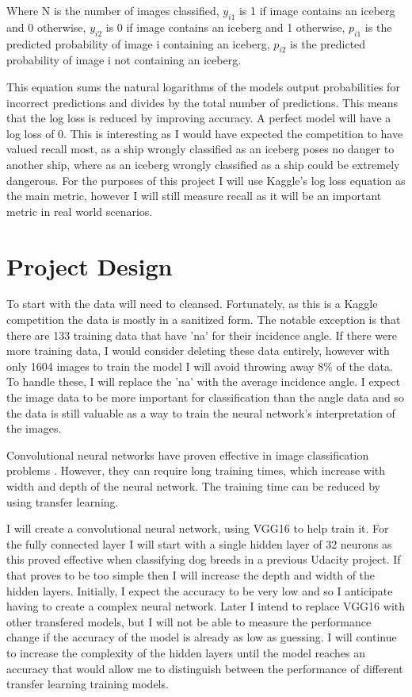 \documentclass{article}
\begin{document}
Where N is the number of images classified, $y_{i1}$ is 1 if image contains an iceberg and 0 otherwise, $y_{i2}$ is 0 if image contains an iceberg and 1 otherwise, $p_{i1}$ is the predicted probability of image i containing an iceberg, $p_{i2}$ is the predicted probability  of image i not containing an iceberg. 

This equation sums the natural logarithms of the models output probabilities for incorrect predictions and divides by the total number of predictions. This means that the log loss is reduced by improving accuracy. A perfect model will have a log loss of 0. This is interesting as I would have expected the competition to have valued recall most, as a ship wrongly classified as an iceberg poses no danger to another ship, where as an iceberg wrongly classified as a ship could be extremely dangerous. For the purposes of this project I will use Kaggle's log loss equation as the main metric, however I will still measure recall as it will be an important metric in real world scenarios. 

\section{Project Design}

To start with the data will need to cleansed. Fortunately, as this is a Kaggle competition the data is mostly in a sanitized form. The notable exception is that there are 133 training data that have 'na' for their incidence angle. If there were more training data, I would consider deleting these data entirely, however with only 1604 images to train the model I will avoid throwing away 8\% of the data. To handle these, I will replace the 'na' with the average incidence angle. I expect the image data to be more important for classification than the angle data and so the data is still valuable as a way to train the neural network's interpretation of the images.

Convolutional neural networks have proven effective in image classification problems \cite{deepcnn}. However, they can require long training times, which increase with width and depth of the neural network. The training time can be reduced by using transfer learning. 

I will create a convolutional neural network, using VGG16 to help train it. For the fully connected layer I will start with a single hidden layer of 32 neurons as this proved effective when classifying dog breeds in a previous Udacity project. If that proves to be too simple then I will increase the depth and width of the hidden layers. Initially, I expect the accuracy to be very low and so I anticipate having to create a complex neural network. Later I intend to replace VGG16 with other transfered models, but I will not be able to measure the performance change if the accuracy of the model is already as low as guessing.  I will continue to increase the complexity of the hidden layers until the model reaches an accuracy that would allow me to distinguish between the performance of different transfer learning training models.
\end{document}
